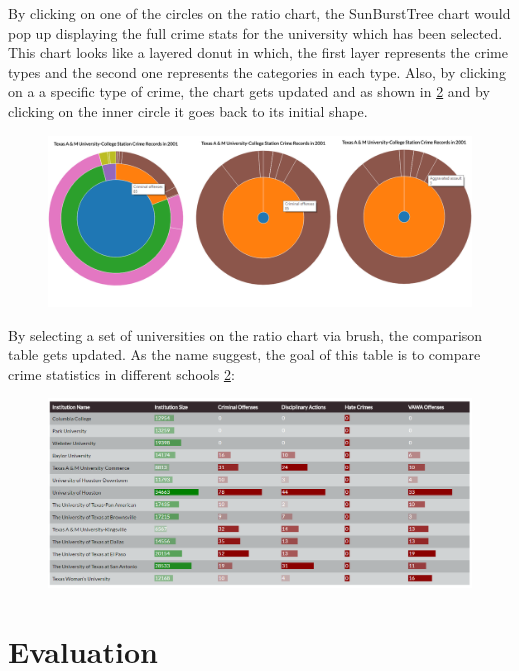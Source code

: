 \documentclass[12pt]{article}
\begin{document}
By clicking on one of the circles on the ratio chart, the SunBurstTree chart would pop up displaying the full crime stats for the university which has been selected. This chart looks like a layered donut in which, the first layer represents the crime types and the second one represents the categories in each type. Also, by clicking on a a specific type of crime, the chart gets updated and as shown in \cref{fig:donut} and by clicking on the inner circle it goes back to its initial shape.

\begin{figure}[H]
   \centering{}
	       \includegraphics[width=7in]{donut.PNG}           
\caption{}
\label{fig:donut}
\end{figure}

By selecting a set of universities on the ratio chart via brush, the comparison table gets updated. As the name suggest, the goal of this table is to compare crime statistics in different schools \cref{fig:donut}:

\begin{figure}[H]
   \centering{}
	       \includegraphics[width=6in]{table.PNG}        
\caption{}
\label{fig:donut}
\end{figure}

\section{Evaluation}



 

\end{document}

